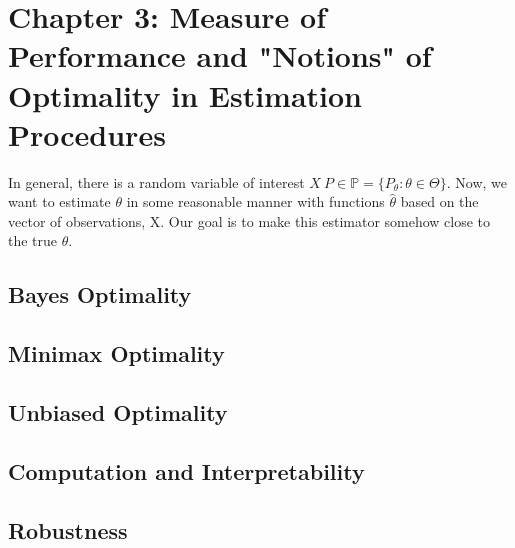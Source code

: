 \section{Chapter 3: Measure of Performance and "Notions" of Optimality in Estimation Procedures}
	
	In general, there is a random variable of interest $X ~ P \in \mathbb{P} = \{P_\theta : \theta \in \Theta \}$. Now, we want to estimate $\theta$ in some reasonable manner with functions $\hat{\theta}$ based on the vector of observations, X. Our goal is to make this estimator somehow close to the true $\theta$. 

	\subsection{Bayes Optimality}

	\subsection{Minimax Optimality}

	\subsection{Unbiased Optimality}

	\subsection{Computation and Interpretability}

	\subsection{Robustness}

